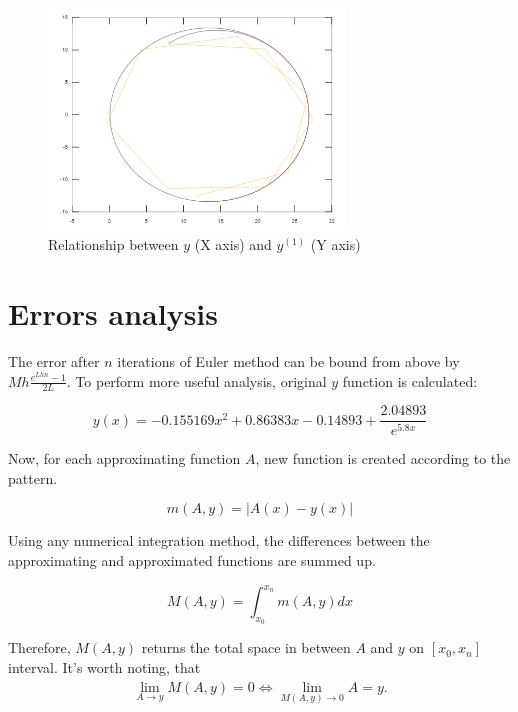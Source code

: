 \documentclass[a4paper,12pt]{article}
\begin{document}
\begin{figure}[H]
    \centering
    \includegraphics[width=0.7\textwidth]{yz.png}
    \caption{Relationship between $y$ (X axis) and $y^{(1)}$ (Y axis)}
    \label{fig:yz}
\end{figure}

\section{Errors analysis}
The error after $n$ iterations of Euler method can be bound from above by $Mh\frac{e^{Lhn} - 1}{2L}$. To perform more useful analysis, original $y$ function is calculated:

\begin{equation}
    y(x) = -0.155169x^2 + 0.86383x - 0.14893 + \frac{2.04893}{e^{5.8x}}
\end{equation}

Now, for each approximating function $A$, new function is created according to the pattern. 

\begin{equation}
    m(A, y) = | A(x) - y(x) |
\end{equation}

Using any numerical integration method, the differences between the approximating and approximated functions are summed up.

\begin{equation}
    M(A, y) = \int_{x_0}^{x_n} m(A, y) dx
\end{equation}

Therefore, $M(A, y)$ returns the total space in between $A$ and $y$ on $[x_0, x_n]$ interval. It's worth noting, that
\begin{gather*}
    \lim_{A \to y} M(A, y) = 0 \iff \lim_{M(A, y) \to 0} A = y.
\end{gather*}
\end{document}
